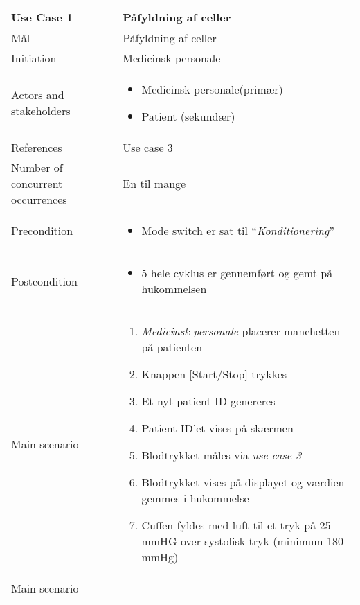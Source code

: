 \begin{center}
		\begin{longtable}{ | m{4cm} | m{8cm}| } 
			\hline
			Use Case 1 & Påfyldning af celler \\
			\hline
			Mål & Påfyldning af celler  \\ 
			\hline
			Initiation &  Medicinsk personale\\
			\hline
			Actors and stakeholders & 
			\begin{itemize}
				\item Medicinsk personale(primær)
				\item Patient (sekundær)
			\end{itemize} \\ 
			\hline
			References & Use case 3 \\ 
			\hline
			Number of concurrent occurrences & En til mange\\ 
			\hline	
			Precondition & 
			\begin{itemize}
				\item Mode switch er sat til “\textit{Konditionering}”
			\end{itemize} \\ 
			\hline
			Postcondition & 
			\begin{itemize}
				\item 5 hele cyklus er gennemført og gemt på hukommelsen
			\end{itemize} \\ 
			\hline
			Main scenario & \begin{enumerate}
				\setlength\itemsep{0cm} %
				\item \textit{Medicinsk personale} placerer manchetten på patienten
				\item Knappen [Start/Stop] trykkes
				\item Et nyt patient ID genereres
				\subitem[Extension \#1] 
				\item Patient ID’et vises på skærmen
				\item Blodtrykket måles via \textit{use case 3}
				\subitem[Extension \#2]
				\item Blodtrykket vises på displayet og værdien gemmes i hukommelse
				\item Cuffen fyldes med luft til et tryk på 25 mmHG over systolisk tryk (minimum 180 mmHg)
			\end{enumerate} \\ 
			\hline
			Main scenario & \begin{enumerate}
				\setlength\itemsep{0cm} %

\end{enumerate}
\end{longtable}
\end{center}
